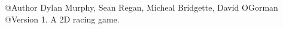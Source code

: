 @\+Author Dylan Murphy, Sean Regan, Micheal Bridgette, David O\textquotesingle{}Gorman @\+Version 1. A 2D racing game. 